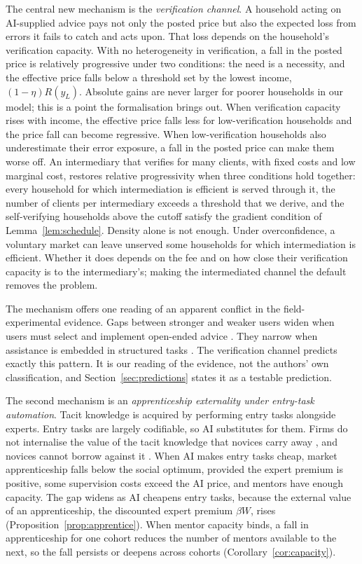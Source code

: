 \documentclass[12pt]{article}
\theoremstyle{remark}
\begin{document}
The central new mechanism is the \emph{verification channel}. A household acting on AI-supplied advice pays not only the posted price but also the expected loss from errors it fails to catch and acts upon. That loss depends on the household's verification capacity. With no heterogeneity in verification, a fall in the posted price is relatively progressive under two conditions: the need is a necessity, and the effective price falls below a threshold set by the lowest income, $(1-\eta)R(y_L)$. Absolute gains are never larger for poorer households in our model; this is a point the formalisation brings out. When verification capacity rises with income, the effective price falls less for low-verification households and the price fall can become regressive. When low-verification households also underestimate their error exposure, a fall in the posted price can make them worse off. An intermediary that verifies for many clients, with fixed costs and low marginal cost, restores relative progressivity when three conditions hold together: every household for which intermediation is efficient is served through it, the number of clients per intermediary exceeds a threshold that we derive, and the self-verifying households above the cutoff satisfy the gradient condition of Lemma~\ref{lem:schedule}. Density alone is not enough. Under overconfidence, a voluntary market can leave unserved some households for which intermediation is efficient. Whether it does depends on the fee and on how close their verification capacity is to the intermediary's; making the intermediated channel the default removes the problem.

The mechanism offers one reading of an apparent conflict in the field-experimental evidence. Gaps between stronger and weaker users widen when users must select and implement open-ended advice \citep{otis2026uneven}. They narrow when assistance is embedded in structured tasks \citep{brynjolfsson2025work,cruces2026narrow}. The verification channel predicts exactly this pattern. It is our reading of the evidence, not the authors' own classification, and Section~\ref{sec:predictions} states it as a testable prediction.

The second mechanism is an \emph{apprenticeship externality under entry-task automation}. Tacit knowledge is acquired by performing entry tasks alongside experts. Entry tasks are largely codifiable, so AI substitutes for them. Firms do not internalise the value of the tacit knowledge that novices carry away \citep{becker1962investment}, and novices cannot borrow against it \citep{ide2025automation}. When AI makes entry tasks cheap, market apprenticeship falls below the social optimum, provided the expert premium is positive, some supervision costs exceed the AI price, and mentors have enough capacity. The gap widens as AI cheapens entry tasks, because the external value of an apprenticeship, the discounted expert premium $\beta W$, rises (Proposition~\ref{prop:apprentice}). When mentor capacity binds, a fall in apprenticeship for one cohort reduces the number of mentors available to the next, so the fall persists or deepens across cohorts (Corollary~\ref{cor:capacity}).
\end{document}
